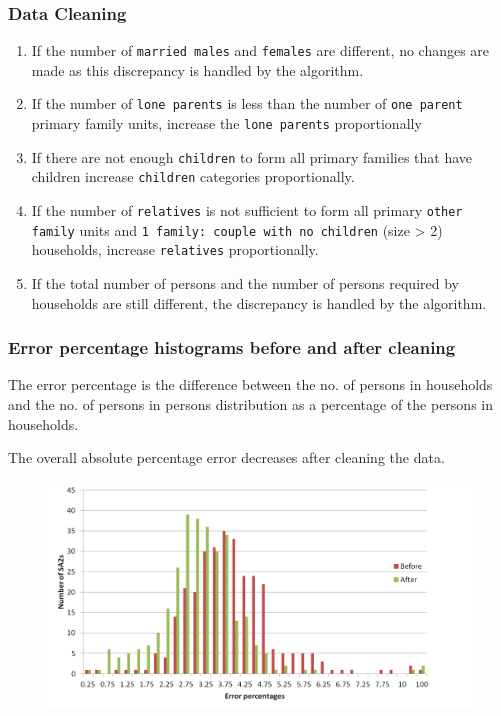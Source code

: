 \begin{frame} 
  \frametitle{Data Cleaning} 
  \begin{enumerate}
      \setlength\itemsep{1em}%
      \conti %
      \item If the number of \texttt{married males} and \texttt{females} are
      different, no changes are made as this discrepancy is handled by the 
      algorithm.%
      \item If the number of \texttt{lone parents} is less than the
      number of \texttt{one parent} primary family units, increase the
      \texttt{lone parents} proportionally%
      \item If there are not enough \texttt{children} to form all primary
      families that have children increase \texttt{children} categories
      proportionally. %
      \item If the number of \texttt{relatives} is not sufficient to form all 
      primary \texttt{other family} units and \texttt{1 family: couple with no 
      children} {\small (size > 2)} households, increase \texttt{relatives} 
      proportionally.%
      \item If the total number of persons and the number of persons required
      by households are still different, the discrepancy is handled by the
      algorithm.%
  \end{enumerate}%
\end{frame}

\begin{frame}
  \frametitle{Error percentage histograms before and after cleaning}
  
  The error percentage is the difference between the no. of persons in 
  households and the no. of persons in persons distribution as a percentage of 
  the persons in households.
  
  The overall absolute percentage error decreases after cleaning the data.
  \vspace{-1em}
  \begin{figure}%
    \includegraphics[trim={0.58cm
      0cm 0 1.5cm},clip,scale=0.5] 
    {images/data-cleaning-error}
  \end{figure}%
  
\end{frame}%
    
